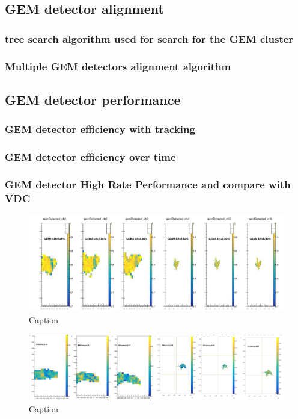 \subsection{GEM detector alignment}

\subsubsection{tree search algorithm used for search for the GEM cluster}
\subsubsection{Multiple GEM detectors alignment algorithm }
\subsection{GEM detector performance}

\subsubsection{GEM detector efficiency with tracking}
\subsubsection{GEM detector efficiency over time}
\subsubsection{GEM detector High Rate Performance and compare with VDC}

\begin{figure}[!htbp]
    \centering
    \includegraphics[width=\textwidth]{images/chap5/lhrs_efficiency_2d.png}
    \caption{Caption}
    \label{fig:my_label}
\end{figure}

\begin{figure}[!htbp]
    \centering
    \includegraphics[width=\textwidth]{images/chap5/rhrs_efficiency_2d.png}
    \caption{Caption}
    \label{fig:my_label}
\end{figure}

